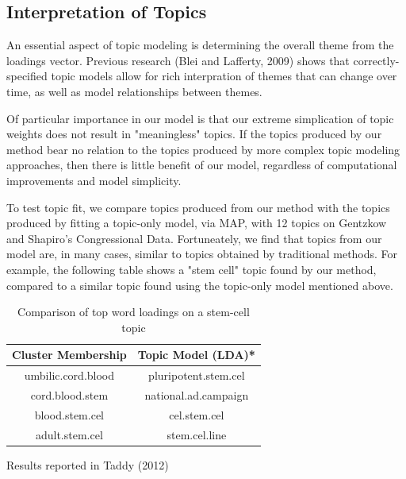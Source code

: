 \documentclass[12pt]{article}
\begin{document}


\subsection{Interpretation of Topics}

An essential aspect of topic modeling is determining the overall theme from the loadings vector. Previous research (Blei and Lafferty, 2009) shows that correctly-specified topic models allow for rich interpration of themes that can change over time, as well as model relationships between themes. 

Of particular importance in our model is that our extreme simplication of topic weights does not result in "meaningless" topics. 
If the topics produced by our method bear no relation to the topics produced by more complex topic modeling approaches, then there is little benefit of our model, regardless of computational improvements and model simplicity. 

To test topic fit, we compare topics produced from our method with the topics produced by fitting a topic-only model, via MAP, with 12 topics on Gentzkow and Shapiro's Congressional Data. Fortuneately, we find that topics from our model are, in many cases, similar to topics obtained by traditional methods. For example, the following table shows a "stem cell" topic found by our method, compared to a similar topic found using the topic-only model mentioned above.

\begin{table}[!htbp]
\begin{threeparttable}
\caption{Comparison of top word loadings on a stem-cell topic} \label{tab:title}
\centering
\begin{tabular}{  c  c }
Cluster Membership & Topic Model (LDA)* \\
\hline
umbilic.cord.blood & pluripotent.stem.cel \\
cord.blood.stem  & national.ad.campaign \\
blood.stem.cel   & cel.stem.cel \\
adult.stem.cel & stem.cel.line \\
\end{tabular}
\begin{tablenotes}
\small
\item  *Results reported in Taddy (2012)
\end{tablenotes}
\end{threeparttable}
\end{table}
\end{document}
